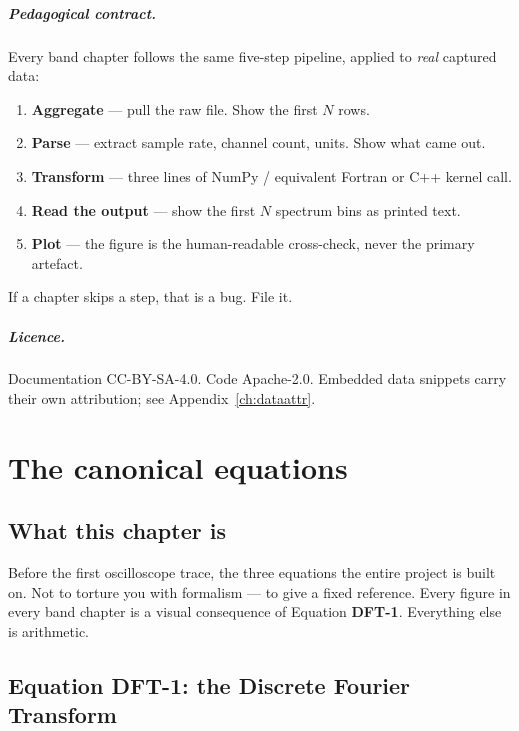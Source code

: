 \documentclass[11pt,a4paper,openany]{book}
\begin{document}
\paragraph{Pedagogical contract.} Every band chapter follows the same
five-step pipeline, applied to \emph{real} captured data:
\begin{enumerate}[label=\textbf{Step \arabic*.},leftmargin=*,itemsep=0pt]
\item \textbf{Aggregate} --- pull the raw file. Show the first $N$ rows.
\item \textbf{Parse} --- extract sample rate, channel count, units. Show what came out.
\item \textbf{Transform} --- three lines of NumPy / equivalent Fortran or C++ kernel call.
\item \textbf{Read the output} --- show the first $N$ spectrum bins as printed text.
\item \textbf{Plot} --- the figure is the human-readable cross-check, never the primary artefact.
\end{enumerate}

If a chapter skips a step, that is a bug. File it.

\paragraph{Licence.} Documentation CC-BY-SA-4.0. Code Apache-2.0.
Embedded data snippets carry their own attribution; see
Appendix~\ref{ch:dataattr}.

\tableofcontents

\renewcommand{\thechapter}{$-\pi$}
\chapter{The canonical equations}
\label{ch:canonical}

\section*{What this chapter is}

Before the first oscilloscope trace, the three equations the entire
project is built on. Not to torture you with formalism --- to give a
fixed reference. Every figure in every band chapter is a visual
consequence of Equation \textbf{DFT-1}. Everything else is arithmetic.

\section{Equation DFT-1: the Discrete Fourier Transform}
\end{document}
